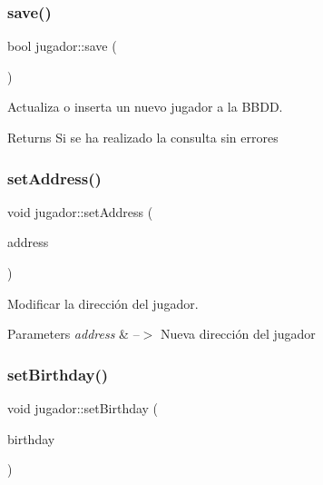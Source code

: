 \subsubsection{\texorpdfstring{save()}{save()}}
{\footnotesize\ttfamily bool jugador\+::save (\begin{DoxyParamCaption}{ }\end{DoxyParamCaption})}



Actualiza o inserta un nuevo jugador a la B\+B\+DD. 

\begin{DoxyReturn}{Returns}
Si se ha realizado la consulta sin errores 
\end{DoxyReturn}
\mbox{\label{classjugador_a1e4da4c657e46c0368f1db72ce102d93}} 
\subsubsection{\texorpdfstring{set\+Address()}{setAddress()}}
{\footnotesize\ttfamily void jugador\+::set\+Address (\begin{DoxyParamCaption}\item[{Q\+String}]{address }\end{DoxyParamCaption})}



Modificar la dirección del jugador. 


\begin{DoxyParams}{Parameters}
{\em address} & --$>$ Nueva dirección del jugador \\
\hline
\end{DoxyParams}
\mbox{\label{classjugador_ac974fe74ff98272b5652de36e5ba4680}} 
\subsubsection{\texorpdfstring{set\+Birthday()}{setBirthday()}}
{\footnotesize\ttfamily void jugador\+::set\+Birthday (\begin{DoxyParamCaption}\item[{Q\+Date}]{birthday }\end{DoxyParamCaption})}



